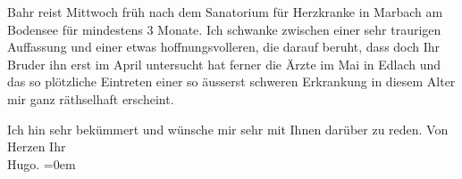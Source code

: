 \pstart
           Bahr reist Mittwoch früh nach dem Sanatorium für Herzkranke in Marbach am Bodensee
               für mindestens 3 Monate. Ich schwanke zwischen einer sehr traurigen Auffassung und
               einer etwas hoffnungsvolleren, die darauf beruht, dass doch Ihr Bruder ihn {\pb}erst im April
               untersucht hat ferner die Ärzte im Mai in Edlach und das so plötzliche Eintreten einer so äusserst schweren Erkrankung
               in diesem Alter mir ganz räthselhaft erscheint.\pend
           
\pstart
           Ich hin sehr bekümmert und wünsche mir sehr mit Ihnen darüber zu reden. Von
               Herzen Ihr{\\[\baselineskip]}\spacefill\mbox{Hugo.}\pend
           \leftskip=0em{}\endnumbering{}  
      